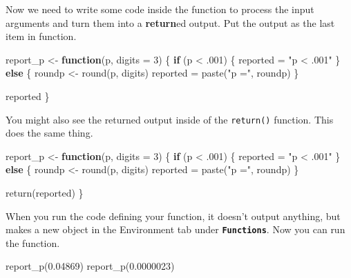 \documentclass[
  oneside]{book}
\newenvironment{Shaded}{\begin{snugshade}}{\end{snugshade}}
\newcommand{\AttributeTok}[1]{\textcolor[rgb]{0.77,0.63,0.00}{#1}}
\newcommand{\ControlFlowTok}[1]{\textcolor[rgb]{0.13,0.29,0.53}{\textbf{#1}}}
\newcommand{\DecValTok}[1]{\textcolor[rgb]{0.00,0.00,0.81}{#1}}
\newcommand{\FloatTok}[1]{\textcolor[rgb]{0.00,0.00,0.81}{#1}}
\newcommand{\FunctionTok}[1]{\textcolor[rgb]{0.00,0.00,0.00}{#1}}
\newcommand{\NormalTok}[1]{#1}
\newcommand{\OtherTok}[1]{\textcolor[rgb]{0.56,0.35,0.01}{#1}}
\newcommand{\SpecialCharTok}[1]{\textcolor[rgb]{0.00,0.00,0.00}{#1}}
\newcommand{\StringTok}[1]{\textcolor[rgb]{0.31,0.60,0.02}{#1}}
\begin{document}
Now we need to write some code inside the function to process the input arguments and turn them into a \textbf{return}ed output. Put the output as the last item in function.

\begin{Shaded}
\begin{Highlighting}[]
\NormalTok{report\_p }\OtherTok{\textless{}{-}} \ControlFlowTok{function}\NormalTok{(p, }\AttributeTok{digits =} \DecValTok{3}\NormalTok{) \{}
  \ControlFlowTok{if}\NormalTok{ (p }\SpecialCharTok{\textless{}}\NormalTok{ .}\DecValTok{001}\NormalTok{) \{}
\NormalTok{    reported }\OtherTok{=} \StringTok{"p \textless{} .001"}
\NormalTok{  \} }\ControlFlowTok{else}\NormalTok{ \{}
\NormalTok{    roundp }\OtherTok{\textless{}{-}} \FunctionTok{round}\NormalTok{(p, digits)}
\NormalTok{    reported }\OtherTok{=} \FunctionTok{paste}\NormalTok{(}\StringTok{"p ="}\NormalTok{, roundp)}
\NormalTok{  \}}
  
\NormalTok{  reported}
\NormalTok{\}}
\end{Highlighting}
\end{Shaded}

You might also see the returned output inside of the \texttt{return()} function. This does the same thing.

\begin{Shaded}
\begin{Highlighting}[]
\NormalTok{report\_p }\OtherTok{\textless{}{-}} \ControlFlowTok{function}\NormalTok{(p, }\AttributeTok{digits =} \DecValTok{3}\NormalTok{) \{}
  \ControlFlowTok{if}\NormalTok{ (p }\SpecialCharTok{\textless{}}\NormalTok{ .}\DecValTok{001}\NormalTok{) \{}
\NormalTok{    reported }\OtherTok{=} \StringTok{"p \textless{} .001"}
\NormalTok{  \} }\ControlFlowTok{else}\NormalTok{ \{}
\NormalTok{    roundp }\OtherTok{\textless{}{-}} \FunctionTok{round}\NormalTok{(p, digits)}
\NormalTok{    reported }\OtherTok{=} \FunctionTok{paste}\NormalTok{(}\StringTok{"p ="}\NormalTok{, roundp)}
\NormalTok{  \}}
  
  \FunctionTok{return}\NormalTok{(reported)}
\NormalTok{\}}
\end{Highlighting}
\end{Shaded}

When you run the code defining your function, it doesn't output anything, but makes a new object in the Environment tab under \textbf{\texttt{Functions}}. Now you can run the function.

\begin{Shaded}
\begin{Highlighting}[]
\FunctionTok{report\_p}\NormalTok{(}\FloatTok{0.04869}\NormalTok{)}
\FunctionTok{report\_p}\NormalTok{(}\FloatTok{0.0000023}\NormalTok{)}
\end{Highlighting}
\end{Shaded}
\end{document}
